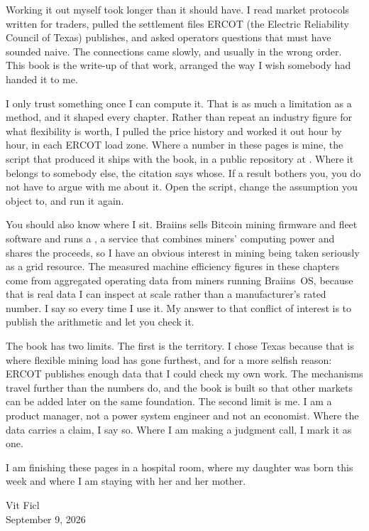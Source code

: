 Working it out myself took longer than it should have. I read market protocols
written for traders, pulled the settlement files ERCOT (the Electric Reliability Council of Texas) publishes, and asked operators questions that must have sounded naive. The
connections came slowly, and usually in the wrong order. This book is the
write-up of that work, arranged the way I wish somebody had handed it to me.

I only trust something once I can compute it. That is as much a limitation as a
method, and it shaped every chapter. Rather than repeat an industry figure for
what flexibility is worth, I pulled the price history and worked it out hour by
hour, in each ERCOT load zone. Where a number in these pages
is mine, the script that produced it ships with the book, in a public repository
at \repourl. Where it belongs to
somebody else, the citation says whose. If a result bothers you, you do not
have to argue with me about it. Open the script, change the assumption you
object to, and run it again.

You should also know where I sit. Braiins sells Bitcoin mining firmware and fleet
software and runs a , a service that combines miners' computing power and shares the proceeds, so I have an obvious interest in mining being
taken seriously as a grid resource. The measured machine efficiency figures in these
chapters come from aggregated operating data from miners running Braiins~OS,
because that is real data I can inspect at scale rather than a manufacturer's rated number. I say so every
time I use it. My answer to that conflict of interest is to publish the arithmetic and let you check it.

The book has two limits. The first is the territory. I chose Texas because that is
where flexible mining load has gone furthest, and for a more selfish reason:
ERCOT publishes enough data that I could check my own work. The mechanisms
travel further than the numbers do, and the book is built so that other markets
can be added later on the same foundation. The second limit is me. I am a
product manager, not a power system engineer and not an economist. Where the
data carries a claim, I say so. Where I am making a judgment call, I mark it as
one.

I am finishing these pages in a hospital room, where my daughter was born this
week and where I am staying with her and her mother.

\vspace{1em}
\noindent Vit Ficl \\
September 9, 2026
